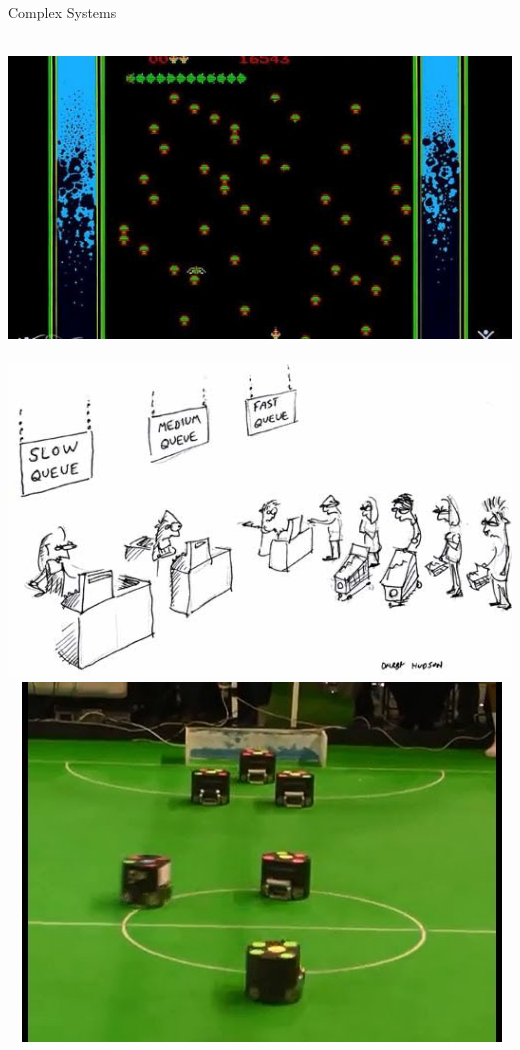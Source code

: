 \documentclass[10pt,handout]{beamer}
\begin{document}
\begin{frame}[fragile]{Complex Systems}

$\mbox{ }$
\includegraphics[scale=0.125]{atari.jpg}
$\mbox{ }$
\includegraphics[scale=0.125]{queues1.jpg}
$\mbox{ }$
\includegraphics[scale=0.125]{robosoc.jpg}

\end{frame}
\end{document}
